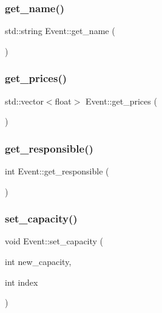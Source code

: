 \subsubsection{\texorpdfstring{get\+\_\+name()}{get\_name()}}
{\footnotesize\ttfamily std\+::string Event\+::get\+\_\+name (\begin{DoxyParamCaption}{ }\end{DoxyParamCaption})\hspace{0.3cm}{\ttfamily [inline]}}

\mbox{\label{class_event_af541a2123d55c40e200617a0b0b38d05}} 
\subsubsection{\texorpdfstring{get\+\_\+prices()}{get\_prices()}}
{\footnotesize\ttfamily std\+::vector$<$float$>$ Event\+::get\+\_\+prices (\begin{DoxyParamCaption}{ }\end{DoxyParamCaption})\hspace{0.3cm}{\ttfamily [inline]}}

\mbox{\label{class_event_ab14e094808f305c5e157c13985a4c20b}} 
\subsubsection{\texorpdfstring{get\+\_\+responsible()}{get\_responsible()}}
{\footnotesize\ttfamily int Event\+::get\+\_\+responsible (\begin{DoxyParamCaption}{ }\end{DoxyParamCaption})\hspace{0.3cm}{\ttfamily [inline]}}

\mbox{\label{class_event_ae9557b078483b093e3c71e6ff2bbac81}} 
\subsubsection{\texorpdfstring{set\+\_\+capacity()}{set\_capacity()}}
{\footnotesize\ttfamily void Event\+::set\+\_\+capacity (\begin{DoxyParamCaption}\item[{int}]{new\+\_\+capacity,  }\item[{int}]{index }\end{DoxyParamCaption})\hspace{0.3cm}{\ttfamily [inline]}}



